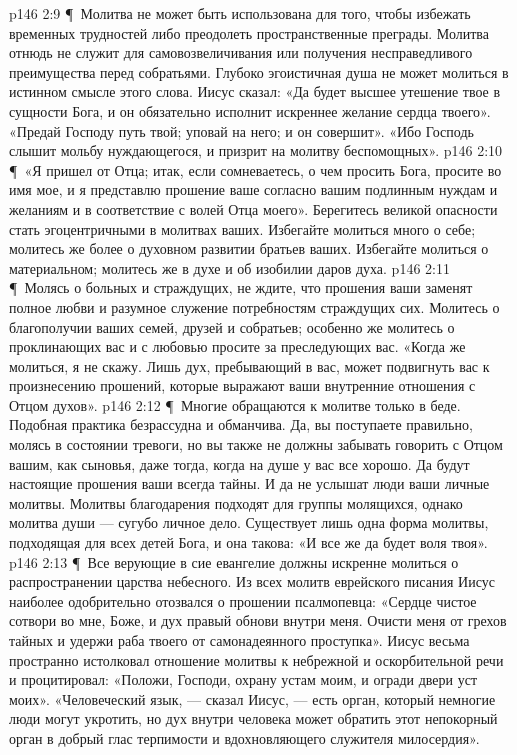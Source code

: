 \vs p146 2:9 \P\ \bibnobreakspace Молитва не может быть использована для того, чтобы избежать временных трудностей либо преодолеть пространственные преграды. Молитва отнюдь не служит для самовозвеличивания или получения несправедливого преимущества перед собратьями. Глубоко эгоистичная душа не может молиться в истинном смысле этого слова. Иисус сказал: «Да будет высшее утешение твое в сущности Бога, и он обязательно исполнит искреннее желание сердца твоего». «Предай Господу путь твой; уповай на него; и он совершит». «Ибо Господь слышит мольбу нуждающегося, и призрит на молитву беспомощных».
\vs p146 2:10 \P\ \bibnobreakspace «Я пришел от Отца; итак, если сомневаетесь, о чем просить Бога, просите во имя мое, и я представлю прошение ваше согласно вашим подлинным нуждам и желаниям и в соответствие с волей Отца моего». Берегитесь великой опасности стать эгоцентричными в молитвах ваших. Избегайте молиться много о себе; молитесь же более о духовном развитии братьев ваших. Избегайте молиться о материальном; молитесь же в духе и об изобилии даров духа.
\vs p146 2:11 \P\ \bibnobreakspace Молясь о больных и страждущих, не ждите, что прошения ваши заменят полное любви и разумное служение потребностям страждущих сих. Молитесь о благополучии ваших семей, друзей и собратьев; особенно же молитесь о проклинающих вас и с любовью просите за преследующих вас. «Когда же молиться, я не скажу. Лишь дух, пребывающий в вас, может подвигнуть вас к произнесению прошений, которые выражают ваши внутренние отношения с Отцом духов».
\vs p146 2:12 \P\ \bibnobreakspace Многие обращаются к молитве только в беде. Подобная практика безрассудна и обманчива. Да, вы поступаете правильно, молясь в состоянии тревоги, но вы также не должны забывать говорить с Отцом вашим, как сыновья, даже тогда, когда на душе у вас все хорошо. Да будут настоящие прошения ваши всегда тайны. И да не услышат люди ваши личные молитвы. Молитвы благодарения подходят для группы молящихся, однако молитва души --- сугубо личное дело. Существует лишь одна форма молитвы, подходящая для всех детей Бога, и она такова: «И все же да будет воля твоя».
\vs p146 2:13 \P\ \bibnobreakspace Все верующие в сие евангелие должны искренне молиться о распространении царства небесного. Из всех молитв еврейского писания Иисус наиболее одобрительно отозвался о прошении псалмопевца: «Сердце чистое сотвори во мне, Боже, и дух правый обнови внутри меня. Очисти меня от грехов тайных и удержи раба твоего от самонадеянного проступка». Иисус весьма пространно истолковал отношение молитвы к небрежной и оскорбительной речи и процитировал: «Положи, Господи, охрану устам моим, и огради двери уст моих». «Человеческий язык, --- сказал Иисус, --- есть орган, который немногие люди могут укротить, но дух внутри человека может обратить этот непокорный орган в добрый глас терпимости и вдохновляющего служителя милосердия».
